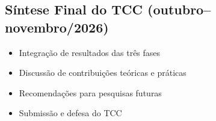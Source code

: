 \subsection{Síntese Final do TCC (outubro--novembro/2026)}

\begin{itemize}
    \item Integração de resultados das três fases
    \item Discussão de contribuições teóricas e práticas
    \item Recomendações para pesquisas futuras
    \item Submissão e defesa do TCC
\end{itemize}